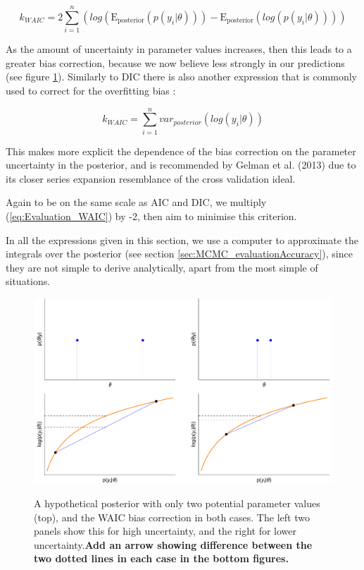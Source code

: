 \documentclass[11pt,fullpage]{book}
\begin{document}
\begin{equation}
k_{WAIC} = 2\sum\limits_{i=1}^{n} \left(log(\mathrm{E_{posterior}}(p(y_i|\theta))) - \mathrm{E_{posterior}}(log(p(y_i|\theta)))\right)
\end{equation}

As the amount of uncertainty in parameter values increases, then this leads to a greater bias correction, because we now believe less strongly in our predictions (see figure \ref{fig:Evaluation_WAICBiasCorrection}). Similarly to DIC there is also another expression that is commonly used to correct for the overfitting bias \cite{gelman2013bayesian}:

\begin{equation}
k_{WAIC} = \sum\limits_{i=1}^{n} var_{posterior}(log(y_i|\theta))
\end{equation}

This makes more explicit the dependence of the bias correction on the parameter uncertainty in the posterior, and is recommended by Gelman et al. (2013) due to its closer series expansion resemblance of the cross validation ideal.

Again to be on the same scale as AIC and DIC, we multiply (\ref{eq:Evaluation_WAIC}) by -2, then aim to minimise this criterion.

In all the expressions given in this section, we use a computer to approximate the integrals over the posterior (see section \ref{sec:MCMC_evaluationAccuracy}), since they are not simple to derive analytically, apart from the most simple of situations.

\begin{figure}
\centering
\scalebox{0.4} 
{\includegraphics{Evaluation_WAICBiasCorrection.pdf}}
\caption{A hypothetical posterior with only two potential parameter values (top), and the WAIC bias correction in both cases. The left two panels show this for high uncertainty, and the right for lower uncertainty.\textbf{Add an arrow showing difference between the two dotted lines in each case in the bottom figures.}}\label{fig:Evaluation_WAICBiasCorrection}
\end{figure}
\end{document}
